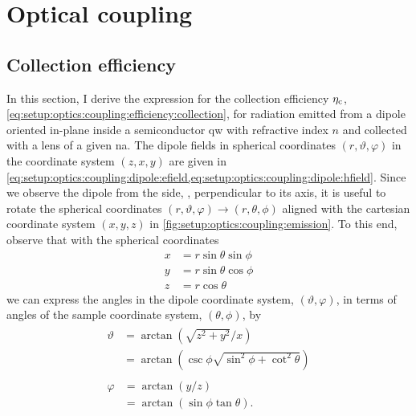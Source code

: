 \chapter{Optical coupling}\label{ch:app:setup:optics}
\section{Collection efficiency}\label{sec:app:setup:optics:collection}
In this section, I derive the expression for the collection efficiency $\eta_{\mathrm{c}}$, \cref{eq:setup:optics:coupling:efficiency:collection}, for radiation emitted from a dipole oriented in-plane inside a semiconductor \gls{qw} with refractive index $n$ and collected with a lens of a given \gls{na}.
The dipole fields in spherical coordinates $(r, \vartheta, \varphi)$ in the coordinate system $(z, x, y)$ are given in \cref{eq:setup:optics:coupling:dipole:efield,eq:setup:optics:coupling:dipole:hfield}.
Since we observe the dipole from the side, \ie, perpendicular to its axis, it is useful to rotate the spherical coordinates $(r, \vartheta, \varphi) \to (r, \theta, \phi)$ aligned with the cartesian coordinate system $(x, y, z)$ in \cref{fig:setup:optics:coupling:emission}.
To this end, observe that with the spherical coordinates
\begin{align}
    x &= r\sin\theta\sin\phi \\
    y &= r\sin\theta\cos\phi \\
    z &= r\cos\theta
\end{align}
we can express the angles in the dipole coordinate system, $(\vartheta, \varphi)$, in terms of angles of the sample coordinate system, $(\theta, \phi)$, by
\begin{align}
    \begin{split}\label{eq:app:setup:optics:collection:vartheta}
        \vartheta &= \arctan(\sqrt{z^2 + y^2}/x) \\
                  &= \arctan(\csc\phi\sqrt{\sin^2\phi + \cot^2\theta})
    \end{split} \\
    \begin{split}\label{eq:app:setup:optics:collection:varphi}
        \varphi &= \arctan(y/z) \\
                &= \arctan(\sin\phi\tan\theta).
    \end{split}
\end{align}
